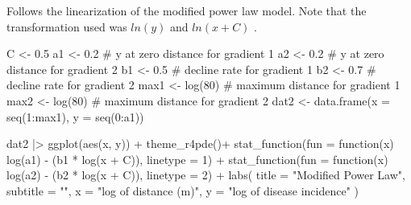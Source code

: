 \documentclass[
  letterpaper,
]{book}
\newenvironment{Shaded}{\begin{snugshade}}{\end{snugshade}}
\newcommand{\AttributeTok}[1]{\textcolor[rgb]{0.40,0.45,0.13}{#1}}
\newcommand{\CommentTok}[1]{\textcolor[rgb]{0.37,0.37,0.37}{#1}}
\newcommand{\ControlFlowTok}[1]{\textcolor[rgb]{0.00,0.23,0.31}{#1}}
\newcommand{\DecValTok}[1]{\textcolor[rgb]{0.68,0.00,0.00}{#1}}
\newcommand{\FloatTok}[1]{\textcolor[rgb]{0.68,0.00,0.00}{#1}}
\newcommand{\FunctionTok}[1]{\textcolor[rgb]{0.28,0.35,0.67}{#1}}
\newcommand{\NormalTok}[1]{\textcolor[rgb]{0.00,0.23,0.31}{#1}}
\newcommand{\OtherTok}[1]{\textcolor[rgb]{0.00,0.23,0.31}{#1}}
\newcommand{\SpecialCharTok}[1]{\textcolor[rgb]{0.37,0.37,0.37}{#1}}
\newcommand{\StringTok}[1]{\textcolor[rgb]{0.13,0.47,0.30}{#1}}
\begin{document}
Follows the linearization of the modified power law model. Note that the
transformation used was \(ln(y)\) and \(ln(x+C)\) .

\begin{Shaded}
\begin{Highlighting}[]
\NormalTok{C }\OtherTok{\textless{}{-}} \FloatTok{0.5}
\NormalTok{a1 }\OtherTok{\textless{}{-}} \FloatTok{0.2} \CommentTok{\# y at zero distance for gradient 1}
\NormalTok{a2 }\OtherTok{\textless{}{-}} \FloatTok{0.2} \CommentTok{\# y at zero distance for gradient 2}
\NormalTok{b1 }\OtherTok{\textless{}{-}} \FloatTok{0.5} \CommentTok{\# decline rate for gradient 1}
\NormalTok{b2 }\OtherTok{\textless{}{-}} \FloatTok{0.7} \CommentTok{\# decline rate for gradient 2}
\NormalTok{max1 }\OtherTok{\textless{}{-}} \FunctionTok{log}\NormalTok{(}\DecValTok{80}\NormalTok{) }\CommentTok{\# maximum distance for gradient 1}
\NormalTok{max2 }\OtherTok{\textless{}{-}} \FunctionTok{log}\NormalTok{(}\DecValTok{80}\NormalTok{) }\CommentTok{\# maximum distance for gradient 2}
\NormalTok{dat2 }\OtherTok{\textless{}{-}} \FunctionTok{data.frame}\NormalTok{(}\AttributeTok{x =} \FunctionTok{seq}\NormalTok{(}\DecValTok{1}\SpecialCharTok{:}\NormalTok{max1), }\AttributeTok{y =} \FunctionTok{seq}\NormalTok{(}\DecValTok{0}\SpecialCharTok{:}\NormalTok{a1))}

\NormalTok{dat2 }\SpecialCharTok{|\textgreater{}}
  \FunctionTok{ggplot}\NormalTok{(}\FunctionTok{aes}\NormalTok{(x, y)) }\SpecialCharTok{+}
  \FunctionTok{theme\_r4pde}\NormalTok{()}\SpecialCharTok{+}
  \FunctionTok{stat\_function}\NormalTok{(}\AttributeTok{fun =} \ControlFlowTok{function}\NormalTok{(x) }\FunctionTok{log}\NormalTok{(a1) }\SpecialCharTok{{-}}\NormalTok{ (b1 }\SpecialCharTok{*} \FunctionTok{log}\NormalTok{(x }\SpecialCharTok{+}\NormalTok{ C)), }\AttributeTok{linetype =} \DecValTok{1}\NormalTok{) }\SpecialCharTok{+}
  \FunctionTok{stat\_function}\NormalTok{(}\AttributeTok{fun =} \ControlFlowTok{function}\NormalTok{(x) }\FunctionTok{log}\NormalTok{(a2) }\SpecialCharTok{{-}}\NormalTok{ (b2 }\SpecialCharTok{*} \FunctionTok{log}\NormalTok{(x }\SpecialCharTok{+}\NormalTok{ C)), }\AttributeTok{linetype =} \DecValTok{2}\NormalTok{) }\SpecialCharTok{+}
  \FunctionTok{labs}\NormalTok{(}
    \AttributeTok{title =} \StringTok{"Modified Power Law"}\NormalTok{,}
    \AttributeTok{subtitle =} \StringTok{""}\NormalTok{,}
    \AttributeTok{x =} \StringTok{"log of distance (m)"}\NormalTok{,}
    \AttributeTok{y =} \StringTok{"log of disease incidence"}
\NormalTok{  )}
\end{Highlighting}
\end{Shaded}
\end{document}
